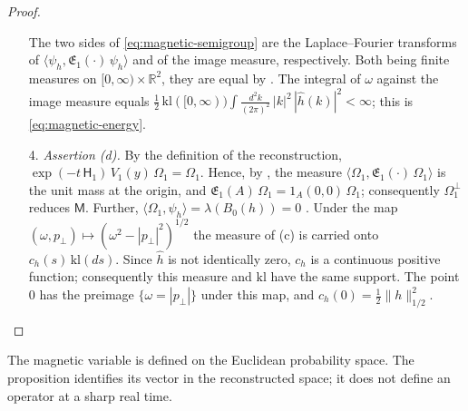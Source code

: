 \documentclass[11pt,letterpaper,reqno]{amsart}
\theoremstyle{definition}
\begin{document}
\begin{proof}
\begin{enumerate}
The two sides of \eqref{eq:magnetic-semigroup} are the Laplace--Fourier transforms of $\langle\psi_h,\mathfrak E_1(\cdot)\,\psi_h\rangle$ \cite[Lemma~12.18\,(b)]{QEDII} and of the image measure, respectively.
Both being finite measures on $[0,\infty)\times\mathbb R^2$, they are equal by \cite[Lemma~12.25]{QEDII}.
The integral of $\omega$ against the image measure equals $\frac12\,\allowbreak \mathrm{kl}([0,\allowbreak \infty))\int\frac{d^2k}{(2\pi)^2}\,\allowbreak |k|^2\,\allowbreak |\hat h(k)|^2<\infty$; this is \eqref{eq:magnetic-energy}.
\item[4.] \emph{Assertion (d).}
By the definition of the reconstruction, $\exp(-t\,\mathsf H_1)\,V_1(y)\,\Omega_1=\Omega_1$.
Hence, by \cite[Lemma~12.25]{QEDII}, the measure $\langle\Omega_1,\mathfrak E_1(\cdot)\,\Omega_1\rangle$ is the unit mass at the origin, and $\mathfrak E_1(A)\,\Omega_1=1_A(0,0)\,\Omega_1$; consequently $\Omega_1^\perp$ reduces $\mathsf M$.
Further, $\langle\Omega_1,\psi_h\rangle=\lambda(B_0(h))=0$ \cite[Lemma~14.3\,(a)]{QEDII}.
Under the map $(\omega,p_\perp)\mapsto(\omega^2-|p_\perp|^2)^{1/2}$ the measure of (c) is carried onto $c_h(s)\,\mathrm{kl}(ds)$.
Since $\hat h$ is not identically zero, $c_h$ is a continuous positive function; consequently this measure and $\mathrm{kl}$ have the same support.
The point $0$ has the preimage $\{\omega=|p_\perp|\}$ under this map, and $c_h(0)=\frac12\|h\|_{1/2}^2$.
\end{enumerate}
\end{proof}

The magnetic variable is defined on the Euclidean probability space.
The proposition identifies its vector in the reconstructed space; it
does not define an operator at a sharp real time.
\end{document}
